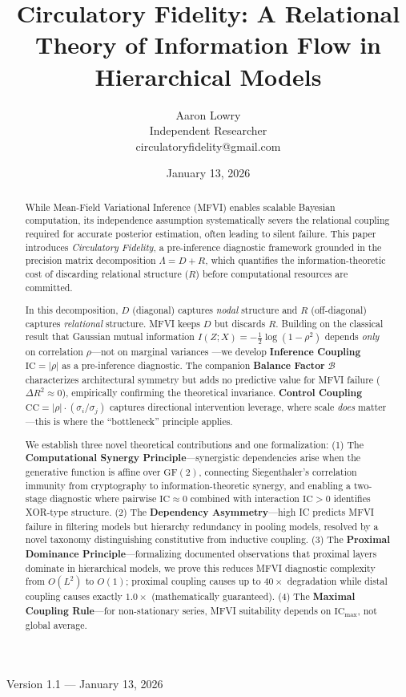 \documentclass[10pt]{article} %
\title{Circulatory Fidelity: A Relational Theory of Information Flow in Hierarchical Models}
\author{\name Aaron Lowry \\
      \addr Independent Researcher \\
      \email circulatoryfidelity@gmail.com}
\date{January 13, 2026}
\theoremstyle{plain}
\theoremstyle{definition}
\newcommand{\IC}{\mathrm{IC}}  %
\newcommand{\BB}{\mathcal{B}}  %
\newcommand{\CC}{\mathrm{CC}}  %
\begin{document}
\maketitle

\begin{center}
{\large Version 1.1 --- January 13, 2026}
\end{center}
\vspace{-1em}

\begin{abstract}
While Mean-Field Variational Inference (MFVI) enables scalable Bayesian computation, its independence assumption systematically severs the relational coupling required for accurate posterior estimation, often leading to silent failure. This paper introduces \emph{Circulatory Fidelity}, a pre-inference diagnostic framework grounded in the precision matrix decomposition $\Lambda = D + R$, which quantifies the information-theoretic cost of discarding relational structure ($R$) before computational resources are committed.

In this decomposition, $D$ (diagonal) captures \emph{nodal} structure and $R$ (off-diagonal) captures \emph{relational} structure. MFVI keeps $D$ but discards $R$. Building on the classical result that Gaussian mutual information $I(Z;X) = -\frac{1}{2}\log(1-\rho^2)$ depends \emph{only} on correlation $\rho$---not on marginal variances \citep{gelfand1959calculation,cover2006elements}---we develop \textbf{Inference Coupling} $\IC = |\rho|$ as a pre-inference diagnostic. The companion \textbf{Balance Factor} $\BB$ characterizes architectural symmetry but adds no predictive value for MFVI failure ($\Delta R^2 \approx 0$), empirically confirming the theoretical invariance. \textbf{Control Coupling} $\CC = |\rho| \cdot (\sigma_i/\sigma_j)$ captures directional intervention leverage, where scale \emph{does} matter---this is where the ``bottleneck'' principle applies.

We establish three novel theoretical contributions and one formalization: (1) The \textbf{Computational Synergy Principle}---synergistic dependencies arise when the generative function is affine over $\text{GF}(2)$, connecting Siegenthaler's correlation immunity from cryptography to information-theoretic synergy, and enabling a two-stage diagnostic where pairwise $\IC \approx 0$ combined with interaction $\IC > 0$ identifies XOR-type structure. (2) The \textbf{Dependency Asymmetry}---high IC predicts MFVI failure in filtering models but hierarchy redundancy in pooling models, resolved by a novel taxonomy distinguishing constitutive from inductive coupling. (3) The \textbf{Proximal Dominance Principle}---formalizing documented observations that proximal layers dominate in hierarchical models, we prove this reduces MFVI diagnostic complexity from $O(L^2)$ to $O(1)$; proximal coupling causes up to $40\times$ degradation while distal coupling causes exactly $1.0\times$ (mathematically guaranteed). (4) The \textbf{Maximal Coupling Rule}---for non-stationary series, MFVI suitability depends on $\IC_{\max}$, not global average.


\end{abstract}
\end{document}
